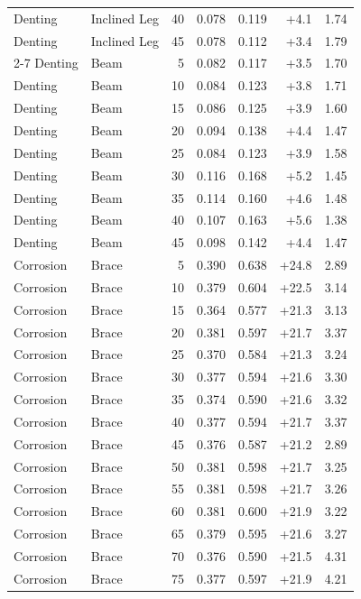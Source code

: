 \begin{longtable}{llrrrrr}
    Denting & Inclined Leg & 40 & 0.078 & 0.119 & +4.1 & 1.74 \\
    Denting & Inclined Leg & 45 & 0.078 & 0.112 & +3.4 & 1.79 \\
    \cmidrule{2-7}
    Denting & Beam & 5 & 0.082 & 0.117 & +3.5 & 1.70 \\
    Denting & Beam & 10 & 0.084 & 0.123 & +3.8 & 1.71 \\
    Denting & Beam & 15 & 0.086 & 0.125 & +3.9 & 1.60 \\
    Denting & Beam & 20 & 0.094 & 0.138 & +4.4 & 1.47 \\
    Denting & Beam & 25 & 0.084 & 0.123 & +3.9 & 1.58 \\
    Denting & Beam & 30 & 0.116 & 0.168 & +5.2 & 1.45 \\
    Denting & Beam & 35 & 0.114 & 0.160 & +4.6 & 1.48 \\
    Denting & Beam & 40 & 0.107 & 0.163 & +5.6 & 1.38 \\
    Denting & Beam & 45 & 0.098 & 0.142 & +4.4 & 1.47 \\
    \midrule
    Corrosion & Brace & 5 & 0.390 & 0.638 & +24.8 & 2.89 \\
    Corrosion & Brace & 10 & 0.379 & 0.604 & +22.5 & 3.14 \\
    Corrosion & Brace & 15 & 0.364 & 0.577 & +21.3 & 3.13 \\
    Corrosion & Brace & 20 & 0.381 & 0.597 & +21.7 & 3.37 \\
    Corrosion & Brace & 25 & 0.370 & 0.584 & +21.3 & 3.24 \\
    Corrosion & Brace & 30 & 0.377 & 0.594 & +21.6 & 3.30 \\
    Corrosion & Brace & 35 & 0.374 & 0.590 & +21.6 & 3.32 \\
    Corrosion & Brace & 40 & 0.377 & 0.594 & +21.7 & 3.37 \\
    Corrosion & Brace & 45 & 0.376 & 0.587 & +21.2 & 2.89 \\
    Corrosion & Brace & 50 & 0.381 & 0.598 & +21.7 & 3.25 \\
    Corrosion & Brace & 55 & 0.381 & 0.598 & +21.7 & 3.26 \\
    Corrosion & Brace & 60 & 0.381 & 0.600 & +21.9 & 3.22 \\
    Corrosion & Brace & 65 & 0.379 & 0.595 & +21.6 & 3.27 \\
    Corrosion & Brace & 70 & 0.376 & 0.590 & +21.5 & 4.31 \\
    Corrosion & Brace & 75 & 0.377 & 0.597 & +21.9 & 4.21 \\

\end{longtable}
